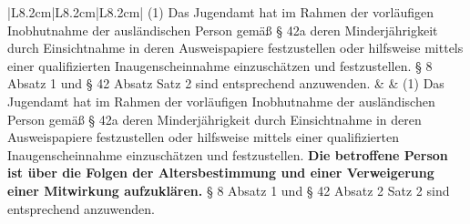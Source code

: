 \documentclass[10pt,a4paper,landscape]{article}
\begin{document}
\begin{longtable}{|L{8.2cm}|L{8.2cm}|L{8.2cm}|}
(1) Das Jugendamt hat im Rahmen der  \newline vorläufigen Inobhutnahme der  \newline ausländischen Person gemäß \S{} 42a deren  \newline Minderjährigkeit durch Einsichtnahme in  \newline deren Ausweispapiere festzustellen oder  \newline hilfsweise mittels einer qualifizierten  \newline Inaugenscheinnahme einzuschätzen und  \newline festzustellen. \S{} 8 Absatz 1 und \S{} 42 Absatz   Satz 2 sind entsprechend anzuwenden. &  & (1) Das Jugendamt hat im Rahmen der  \newline vorläufigen Inobhutnahme der  \newline ausländischen Person gemäß \S{} 42a deren  \newline Minderjährigkeit durch Einsichtnahme in  \newline deren Ausweispapiere festzustellen oder  \newline hilfsweise mittels einer qualifizierten  \newline Inaugenscheinnahme einzuschätzen und  \newline festzustellen. \textbf{\textcolor{diffgreen}{Die betroffene Person ist  \newline über die Folgen der Altersbestimmung  \newline und einer Verweigerung einer  \newline Mitwirkung aufzuklären.}} \S{} 8 Absatz 1 und  \newline \S{} 42 Absatz 2 Satz 2 sind entsprechend  \newline anzuwenden. \\
\hhline{|---|}

\end{longtable}
\end{document}
